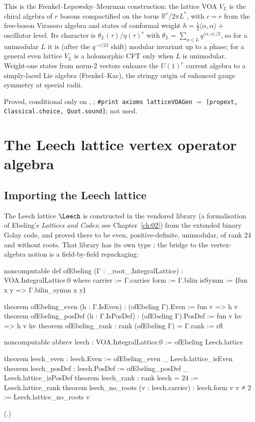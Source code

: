 \begin{physics}
This is the Frenkel--Lepowsky--Meurman construction: the lattice VOA $V_L$ is the chiral algebra of $r$ bosons compactified on the torus $\mathbb R^r/2\pi L^*$, with $c=r$ from the free-boson Virasoro algebra and states of conformal weight $h=\frac12\langle\alpha,\alpha\rangle+$ oscillator level. Its character is $\theta_L(\tau)/\eta(\tau)^r$ with $\theta_L=\sum_{\alpha\in L}q^{\langle\alpha,\alpha\rangle/2}$, so for a unimodular $L$ it is (after the $q^{-c/24}$ shift) modular invariant up to a phase; for a general even lattice $V_L$ is a holomorphic CFT only when $L$ is unimodular. Weight-one states from norm-$2$ vectors enhance the $U(1)^r$ current algebra to a simply-laced Lie algebra (Frenkel--Kac), the stringy origin of enhanced gauge symmetry at special radii.
\end{physics}

\begin{status}
Proved, conditional only on , ;
\texttt{\#print axioms latticeVOAGen} $=$ \texttt{[propext, Classical.choice, Quot.sound]};
 not used.
\end{status}

\section{The Leech lattice vertex operator algebra}\label{ch03:sec:leech}

\subsection{Importing the Leech lattice}

The Leech lattice $\Leech$ is constructed in the vendored library
 (a formalisation of Ebeling's \emph{Lattices and Codes}; see
Chapter~\ref{ch:02}) from the extended binary Golay code, and proved there to be even,
positive-definite, unimodular, of rank $24$ and without roots. That library has its own type
; the bridge to the vertex-algebra notion is a field-by-field
repackaging:
\begin{leancode}
noncomputable def ofEbeling (Γ : _root_.IntegralLattice) : VOA.IntegralLattice.{0} where
  carrier := Γ.carrier
  form := Γ.bilin
  isSymm := ⟨fun x y => Γ.bilin_symm x y⟩

theorem ofEbeling_even (h : Γ.IsEven) : (ofEbeling Γ).Even := fun v => h v
theorem ofEbeling_posDef (h : Γ.IsPosDef) : (ofEbeling Γ).PosDef := fun v hv => h v hv
theorem ofEbeling_rank : rank (ofEbeling Γ) = Γ.rank := rfl

noncomputable abbrev leech : VOA.IntegralLattice.{0} := ofEbeling Leech.lattice

theorem leech_even : leech.Even := ofEbeling_even _ Leech.lattice_isEven
theorem leech_posDef : leech.PosDef := ofEbeling_posDef _ Leech.lattice_isPosDef
theorem leech_rank : rank leech = 24 := Leech.lattice_rank
theorem leech_no_roots (v : leech.carrier) : leech.form v v ≠ 2 := Leech.lattice_no_roots v
\end{leancode}
(.)

